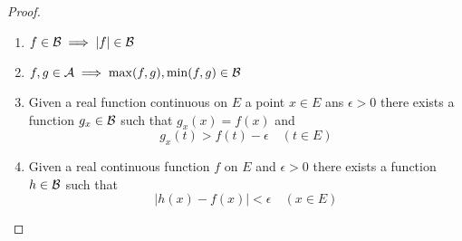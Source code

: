 \documentclass{article}
\newcommand{\abs}[1]{\left|#1\right|}
\begin{document}
\begin{proof}
\begin{enumerate}[label=(\alph*)]
    \item $f\in \mcB  \implies \abs{f}\in \mcB$
    \item $f,g\in \mathcal{A} \implies \max(f,g), \min(f,g) \in 
    \mathcal{B}$
    \item Given a real function continuous on $E$ a point $x\in E$ ans $\epsilon>0$ there exists a function $g_x\in \mathcal{B} $ such that $g_x(x)=f(x)$ and \[g_x(t)>f(t)-\epsilon \quad (t\in E)\]
    \item Given a real continuous function $f$ on $E$ and $\epsilon>0$ there exists a function $h\in \mathcal{B}$ such that \[\abs{h(x)-f(x)}<\epsilon \quad (x\in E)\]
\end{enumerate}
\end{proof}



















\printbibliography
\end{document}
